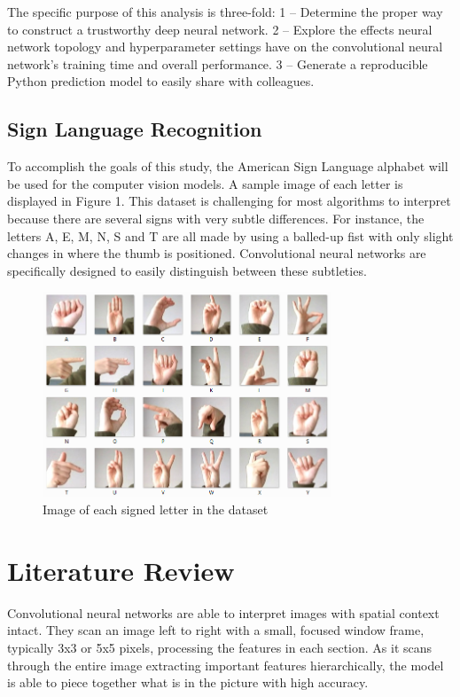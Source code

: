 \documentclass[5p,authoryear]{elsarticle}
\begin{document}
The specific purpose of this analysis is three-fold: 1 – Determine the proper way to construct a trustworthy deep neural network. 2 – Explore the effects neural network topology and hyperparameter settings have on the convolutional neural network’s training time and overall performance. 3 – Generate a reproducible Python prediction model to easily share with colleagues. 



\subsection{Sign Language Recognition} \label{sign}

To accomplish the goals of this study, the American Sign Language alphabet will be used for the computer vision models. A sample image of each letter is displayed in Figure 1. This dataset is challenging for most algorithms to interpret because there are several signs with very subtle differences. For instance, the letters A, E, M, N, S and T are all made by using a balled-up fist with only slight changes in where the thumb is positioned. Convolutional neural networks are specifically designed to easily distinguish between these subtleties. 

\begin{figure}[!htb] \centering
	\includegraphics[width=3.4in]{figures/amer_sign2}
	\caption[]{Image of each signed letter in the dataset} %
\end{figure}



\section{Literature Review} \label{lit_rev}

Convolutional neural networks are able to interpret images with spatial context intact. They scan an image left to right with a small, focused window frame, typically 3x3 or 5x5 pixels, processing the features in each section. As it scans through the entire image extracting important features hierarchically, the model is able to piece together what is in the picture with high accuracy. 
\end{document}
